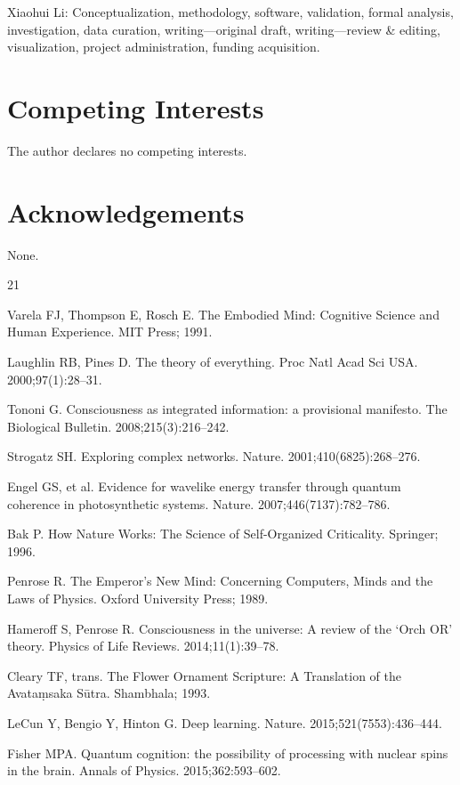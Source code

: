 \documentclass[11pt,a4paper]{article}
\begin{document}
Xiaohui Li: Conceptualization, methodology, software, validation, formal analysis, investigation, data curation, writing---original draft, writing---review \& editing, visualization, project administration, funding acquisition.

\section*{Competing Interests}

The author declares no competing interests.

\section*{Acknowledgements}

None.

\begin{thebibliography}{21}

 Varela FJ, Thompson E, Rosch E. The Embodied Mind: Cognitive Science and Human Experience. MIT Press; 1991.

 Laughlin RB, Pines D. The theory of everything. Proc Natl Acad Sci USA. 2000;97(1):28--31.

 Tononi G. Consciousness as integrated information: a provisional manifesto. The Biological Bulletin. 2008;215(3):216--242.

 Strogatz SH. Exploring complex networks. Nature. 2001;410(6825):268--276.

 Engel GS, et al. Evidence for wavelike energy transfer through quantum coherence in photosynthetic systems. Nature. 2007;446(7137):782--786.

 Bak P. How Nature Works: The Science of Self-Organized Criticality. Springer; 1996.

 Penrose R. The Emperor's New Mind: Concerning Computers, Minds and the Laws of Physics. Oxford University Press; 1989.

 Hameroff S, Penrose R. Consciousness in the universe: A review of the `Orch OR' theory. Physics of Life Reviews. 2014;11(1):39--78.

 Cleary TF, trans. The Flower Ornament Scripture: A Translation of the Avata\d{m}saka S\={u}tra. Shambhala; 1993.

 LeCun Y, Bengio Y, Hinton G. Deep learning. Nature. 2015;521(7553):436--444.

 Fisher MPA. Quantum cognition: the possibility of processing with nuclear spins in the brain. Annals of Physics. 2015;362:593--602.


\end{thebibliography}
\end{document}
